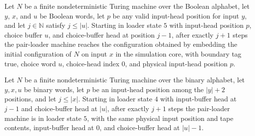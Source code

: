 \begin{lemma}
\label{Complexity.cont_rewind_choices}
\leanok
{}
Let $N$ be a finite nondeterministic Turing machine over the Boolean alphabet, let $y$,
$x$, and $u$ be Boolean words, let $p$ be any valid input-head position for input $y$,
and let $j\in\mathbb{N}$ satisfy $j\le |u|$. Starting in loader state $5$ with
input-head position $p$, choice buffer $u$, and choice-buffer head at position $j-1$,
after exactly $j+1$ steps the pair-loader machine reaches the configuration obtained by
embedding the initial configuration of $N$ on input $x$ in the simulation core, with
boundary tag true, choice word $u$, choice-head index $0$, and physical input-head
position $p$.
\end{lemma}

\begin{lemma}
\label{Complexity.cont_rewind_input}
\leanok
{}
Let $N$ be a finite nondeterministic Turing machine over the binary alphabet, let
$y,x,u$ be binary words, let $p$ be an input-head position among the $|y|+2$ positions,
and let $j\le |x|$. Starting in loader state $4$ with input-buffer head at $j-1$ and
choice-buffer head at $|u|$, after exactly $j+1$ steps the pair-loader machine is in
loader state $5$, with the same physical input position and tape contents, input-buffer
head at $0$, and choice-buffer head at $|u|-1$.
\end{lemma}

